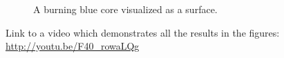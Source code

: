 \begin{figure}[h!]
\centering
{}
\caption
{
\label{fig:fire5}
A burning blue core visualized as a surface.
}
\end{figure}       

Link to a video which demonstrates all the results in the figures:
\url{http://youtu.be/F40_rowaLQg} 
